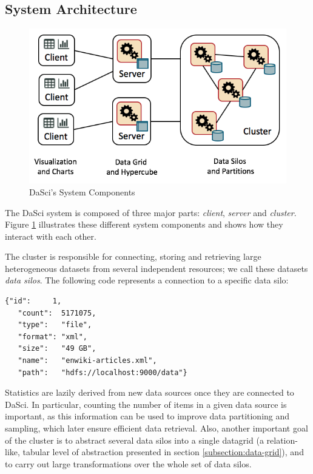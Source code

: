 \documentclass[10pt, a4paper, twocolumn]{article} %
\begin{document}
\subsection{System Architecture}


\begin{figure}
	\centering
	\includegraphics[scale=0.35]{images/system.png}
	\caption{DaSci's System Components}
	\label{figure:system}
\end{figure}


The DaSci system is composed of three major parts: \textit{client}, \textit{server} and \textit{cluster}.
Figure \ref{figure:system} illustrates these different system components and shows how they interact with each other. 

The cluster is responsible for connecting, storing and retrieving large heterogeneous datasets from several independent resources; we call these datasets \textit{data silos}. 
The following code represents a connection to a specific data silo:

\begin{lstlisting}[numbers=none,basicstyle=\small] 
  {"id":     1,
   "count":  5171075,
   "type":   "file",
   "format": "xml",
   "size":   "49 GB",
   "name":   "enwiki-articles.xml",
   "path":   "hdfs://localhost:9000/data"}
\end{lstlisting}


Statistics are lazily derived from new data sources once they are connected to DaSci. In particular, counting the number of items in a given data source is important, as this information can be used to improve data partitioning and sampling, which later ensure efficient data retrieval.
Also, another important goal of the cluster is to abstract several data silos into a single datagrid (a relation-like, tabular level of abstraction presented in section \ref{subsection:data-grid}), and to carry out large transformations over the whole set of data silos.
\end{document}
